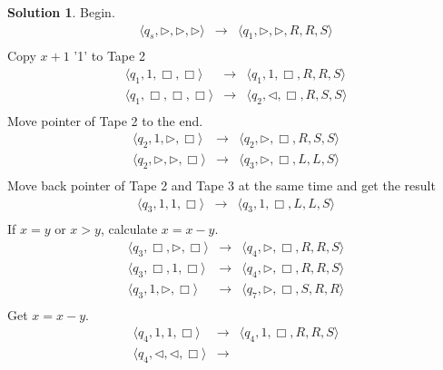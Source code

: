 \documentclass[12pt,a4paper]{article}
\theoremstyle{definition}
\newtheorem*{solution}{Solution}
\numberwithin{equation}{section}
\numberwithin{figure}{section}
\begin{document}
\begin{enumerate}
    \begin{solution}
    Begin.
    \begin{eqnarray*}
   \langle q_s,\triangleright,\triangleright,  \triangleright  \rangle & \rightarrow & \langle q_1, \triangleright,\triangleright, R, R, S   \rangle \\
\end{eqnarray*}
    Copy $x+1$ '1' to Tape 2
\begin{eqnarray*}
   \langle q_1,1,\Box,  \Box  \rangle & \rightarrow &
   \langle q_1, 1,\Box, R, R, S   \rangle \\
   \langle q_1,\Box ,\Box,  \Box  \rangle & \rightarrow &
   \langle q_2, \triangleleft,\Box, R, S, S   \rangle \\
\end{eqnarray*}
    Move pointer of Tape 2 to the end.
    \begin{eqnarray*}
   \langle q_2,1,\triangleright,  \Box  \rangle & \rightarrow &
    \langle q_2, \triangleright,\Box, R, S, S   \rangle \\
    \langle q_2,\triangleright,\triangleright,  \Box  \rangle & \rightarrow &
    \langle q_3, \triangleright,\Box, L, L, S   \rangle \\
    \end{eqnarray*}
    Move back pointer of Tape 2 and Tape 3 at the same time and get the result
     \begin{eqnarray*}
   \langle q_3,1,1,  \Box  \rangle & \rightarrow &
    \langle q_3, 1,\Box, L, L, S   \rangle \\
    \end{eqnarray*}
    If $x=y$ or $x>y$, calculate $x = x - y$.
     \begin{eqnarray*}
   \langle q_3,\Box,\triangleright,  \Box  \rangle & \rightarrow &
    \langle q_4, \triangleright,\Box, R, R, S   \rangle \\
   \langle q_3,\Box,1,  \Box  \rangle & \rightarrow &
    \langle q_4, \triangleright,\Box, R, R, S   \rangle \\
   \langle q_3,1,\triangleright,  \Box  \rangle & \rightarrow &
    \langle q_7, \triangleright,\Box, S, R, R   \rangle \\
    \end{eqnarray*}
    Get $x = x - y$. 
    \begin{eqnarray*}
   \langle q_4,1,1,  \Box  \rangle & \rightarrow &
    \langle q_4, 1,\Box, R, R, S   \rangle \\
    \langle q_4,\triangleleft,\triangleleft,  \Box  \rangle & \rightarrow &

\end{eqnarray*}
\end{solution}
\end{enumerate}
\end{document}
